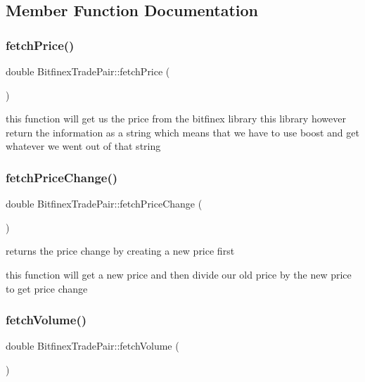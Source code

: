 \subsection{Member Function Documentation}
\mbox{\label{class_bitfinex_trade_pair_a6ae365c882e5950c87fbfba9058b24ac}} 
\subsubsection{\texorpdfstring{fetch\+Price()}{fetchPrice()}}
{\footnotesize\ttfamily double Bitfinex\+Trade\+Pair\+::fetch\+Price (\begin{DoxyParamCaption}{ }\end{DoxyParamCaption})}

this function will get us the price from the bitfinex library this library however return the information as a string which means that we have to use boost and get whatever we went out of that string \mbox{\label{class_bitfinex_trade_pair_ac28554bdf8f8397e8d751c792aebf948}} 
\subsubsection{\texorpdfstring{fetch\+Price\+Change()}{fetchPriceChange()}}
{\footnotesize\ttfamily double Bitfinex\+Trade\+Pair\+::fetch\+Price\+Change (\begin{DoxyParamCaption}{ }\end{DoxyParamCaption})}



returns the price change by creating a new price first 

this function will get a new price and then divide our old price by the new price to get price change \mbox{\label{class_bitfinex_trade_pair_a5e9752e1d32db469a3ce368bc1de2886}} 
\subsubsection{\texorpdfstring{fetch\+Volume()}{fetchVolume()}}
{\footnotesize\ttfamily double Bitfinex\+Trade\+Pair\+::fetch\+Volume (\begin{DoxyParamCaption}{ }\end{DoxyParamCaption})}

